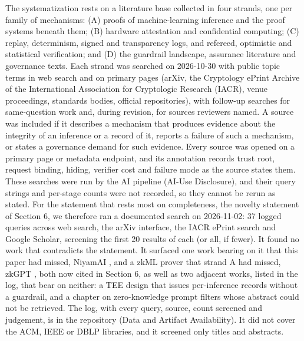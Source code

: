 \documentclass[11pt]{article}
\begin{document}
The systematization rests on a literature base collected in four strands, one per family of mechanisms: (A) proofs of machine-learning inference and the proof systems beneath them; (B) hardware attestation and confidential computing; (C) replay, determinism, signed and transparency logs, and refereed, optimistic and statistical verification; and (D) the guardrail landscape, assurance literature and governance texts. Each strand was searched on 2026-10-30 with public topic terms in web search and on primary pages (arXiv, the Cryptology ePrint Archive of the International Association for Cryptologic Research (IACR), venue proceedings, standards bodies, official repositories), with follow-up searches for same-question work and, during revision, for sources reviewers named. A source was included if it describes a mechanism that produces evidence about the integrity of an inference or a record of it, reports a failure of such a mechanism, or states a governance demand for such evidence. Every source was opened on a primary page or metadata endpoint, and its annotation records trust root, request binding, hiding, verifier cost and failure mode as the source states them. These searches were run by the AI pipeline (AI-Use Disclosure), and their query strings and per-stage counts were not recorded, so they cannot be rerun as stated. For the statement that rests most on completeness, the novelty statement of Section 6, we therefore ran a documented search on 2026-11-02: 37 logged queries across web search, the arXiv interface, the IACR ePrint search and Google Scholar, screening the first 20 results of each (or all, if fewer). It found no work that contradicts the statement. It surfaced one work bearing on it that this paper had missed, NiyamAI \cite{A44}, and a zkML prover that strand A had missed, zkGPT \cite{A45}, both now cited in Section 6, as well as two adjacent works, listed in the log, that bear on neither: a TEE design that issues per-inference records without a guardrail, and a chapter on zero-knowledge prompt filters whose abstract could not be retrieved. The log, with every query, source, count screened and judgement, is in the repository (Data and Artifact Availability). It did not cover the ACM, IEEE or DBLP libraries, and it screened only titles and abstracts.
\end{document}
